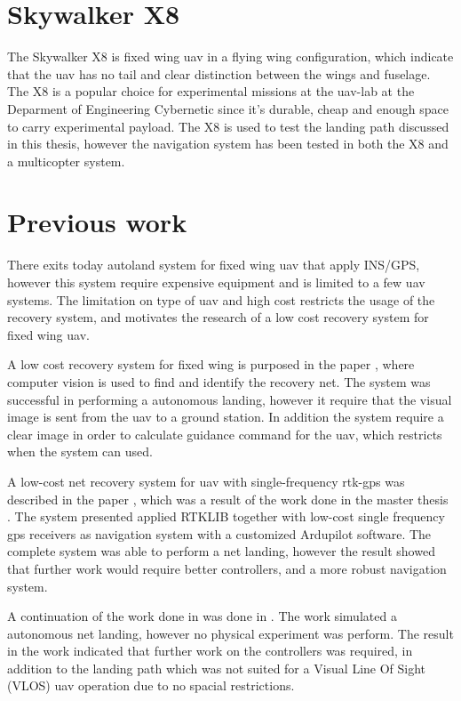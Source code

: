 \section{Skywalker X8}
The Skywalker X8 is fixed wing \gls{uav} in a flying wing configuration, which indicate that the \gls{uav} has no tail and clear distinction between the wings and fuselage. The X8 is a popular choice for experimental missions at the \gls{uav}-lab at the Deparment of Engineering Cybernetic since it's durable, cheap and enough space to carry experimental payload. The X8 is used to test the landing path discussed in this thesis, however the navigation system has been tested in both the X8 and a multicopter system.
\section{Previous work}
There exits today autoland system for fixed wing \gls{uav} that apply INS/GPS\citep{SkyHook}, however this system require expensive equipment and is limited to a few \gls{uav} systems. The limitation on type of \gls{uav} and high cost restricts the usage of the recovery system, and motivates the research of a low cost recovery system for fixed wing \gls{uav}.

A low cost recovery system for fixed wing  is purposed in the paper \citep{kim2013fully}, where computer vision is used to find and identify the recovery net. The system was successful in performing a autonomous landing, however it require that the visual image is sent from the \gls{uav} to a ground station. In addition the system require a clear image in order to calculate guidance command for the \gls{uav}, which restricts when the system can used.

A low-cost net recovery system for \gls{uav} with single-frequency \gls{rtk-gps} was described in the paper \citep{skulstad2015net}, which was a result of the work done in the master thesis \citep{Skulstad&Syversen}. The system presented applied RTKLIB together with low-cost single frequency \gls{gps} receivers as navigation system with a customized Ardupilot software. The complete system was able to perform a net landing, however the result showed that further work would require better controllers, and a more robust navigation system.

A continuation of the work done in \citep{Skulstad&Syversen} was done in \citep{Froelich}. The work simulated a autonomous net landing, however no physical experiment was perform. The result in the work indicated that further work on the controllers was required, in addition to the landing path which was not suited for a Visual Line Of Sight  (VLOS) \gls{uav} operation due to no spacial restrictions.
